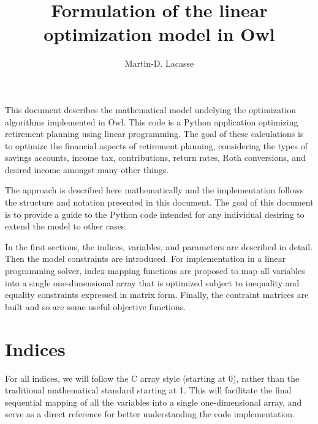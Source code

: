 \documentclass{article}[fleqn,12pt]
\begin{document}
\title{Formulation of the linear optimization model in Owl}
\author{Martin-D. Lacasse}
\maketitle
\thispagestyle{fancy}
\fancyhead{}

This document describes the mathematical model undelying
the optimization algorithms implemented in
Owl. This code is a Python application optimizing retirement
planning using linear programming. The goal of
these calculations is to optimize the financial aspects
of retirement planning, considering the types of savings accounts,
income tax, contributions, return rates, Roth conversions,
and desired income amongst many other things.

The approach is described here mathematically and the implementation
follows the structure and notation presented in this document.
The goal of this document is to provide a guide to the Python code
intended for any individual desiring to extend the model to other cases.

In the first sections, the indices, variables, and parameters are
described in detail. Then the model constraints are introduced.
For implementation in a linear programming solver, index mapping
functions are proposed to map all variables into a single
one-dimensional array that
is optimized subject to inequality and equality constraints
expressed in matrix form. Finally, the contraint matrices are built
and so are some useful objective functions.

\section{Indices}
For all indices, we will follow the C array style (starting at 0),
rather than the traditional mathematical standard starting at 1.
This will facilitate the final
sequential mapping of all the variables into a single one-dimensional array,
and serve as a direct reference for better understanding the code implementation.
\end{document}
